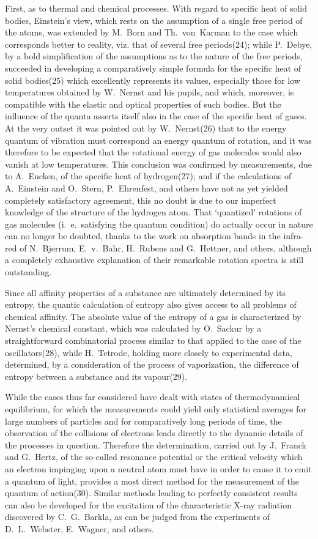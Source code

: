 \documentclass[12pt,oneside]{book}
\begin{document}
First, as to thermal and chemical processes. With regard
to specific heat of solid bodies, Einstein's view, which rests
on the assumption of a single free period of the atoms, was
extended by M.~Born and Th.~von~Karman to the case
which corresponds better to reality, viz. that of several free
periods(24); while P.~Debye, by a bold simplification of
the assumptions as to the nature of the free periods, succeeded
in developing a comparatively simple formula for
the specific heat of solid bodies(25) which excellently represents
its values, especially those for low temperatures
obtained by W.~Nernst and his pupils, and which, moreover,
is compatible with the elastic and optical properties of such
bodies. But the influence of the quanta asserts itself also
in the case of the specific heat of gases. At the very
outset it was pointed out by W.~Nernst(26) that to the
energy quantum of vibration must correspond an energy
quantum of rotation, and it was therefore to be expected
that the rotational energy of gas molecules would also
vanish at low temperatures. This conclusion was confirmed
by measurements, due to A.~Eucken, of the specific heat of
hydrogen(27); and if the calculations of A.~Einstein and
O.~Stern, P.~Ehrenfest, and others have not as yet yielded
completely satisfactory agreement, this no doubt is due to
our imperfect knowledge of the structure of the hydrogen
atom. That `quantized' rotations of gas molecules (i.~e.~satisfying
the quantum condition) do actually occur in
nature can no longer be doubted, thanks to the work on
absorption bands in the infra-red of N.~Bjerrum, E.~v.~Bahr,
H.~Rubens and G.~Hettner, and others, although a completely
exhaustive explanation of their remarkable rotation
spectra is still outstanding.

Since all affinity properties of a substance are ultimately
determined by its entropy, the quantic calculation of entropy
also gives access to all problems of chemical affinity.
The absolute value of the entropy of a gas is characterized
by Nernst's chemical constant, which was calculated by
O.~Sackur by a straightforward combinatorial process similar
to that applied to the case of the oscillators(28), while
H.~Tetrode, holding more closely to experimental data,
determined, by a consideration of the process of vaporization,
the difference of entropy between a substance and its
vapour(29).

While the cases thus far considered have dealt with
states of thermodynamical equilibrium, for which the measurements
could yield only statistical averages for large
numbers of particles and for comparatively long periods of
time, the observation of the collisions of electrons leads
directly to the dynamic details of the processes in question.
Therefore the determination, carried out by J.~Franck and
G.~Hertz, of the so-called resonance potential or the critical
velocity which an electron impinging upon a neutral atom
must have in order to cause it to emit a quantum of light,
provides a most direct method for the measurement of the
quantum of action(30). Similar methods leading to perfectly
consistent results can also be developed for the
excitation of the characteristic X-ray radiation discovered
by C.~G.~Barkla, as can be judged from the experiments
of D.~L.~Webster, E.~Wagner, and others.
\end{document}
